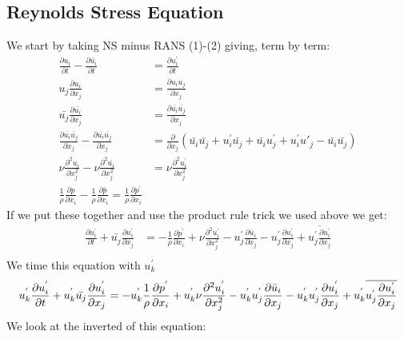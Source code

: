 \documentclass[a4paper,norsk]{article}
\begin{document}
\subsection*{Reynolds Stress Equation}
We start by taking NS minus RANS (1)-(2) giving, term by term:
\begin{align*}
\frac{\partial u_i}{\partial t} - \frac{\partial \bar{u_i}}{\partial t} &= \frac{\partial u^{'}_i}{\partial t}\\
u_j \frac{\partial u_i}{\partial x_j} &= \frac{\partial u_iu_j}{\partial x_j} \\
\bar{u_j} \frac{\partial \bar{u_i}}{\partial x_j} &= \frac{\partial \bar{u_i}\bar{u_j}}{\partial x_j} \\
\frac{\partial \bar{u_i}\bar{u_j}}{\partial x_j} - \frac{\partial \bar{u_i}\bar{u_j}}{\partial x_j} &= \frac{\partial }{\partial x_j} (\bar{u_i}\bar{u_j} + u^{'}_i\bar{u_j} + \bar{u_i}u^{'}_j + u^{'}_i u{'}_j -\bar{u_i}\bar{u_j} )\\
\nu \frac{\partial^2 u_i}{\partial x_j^2} - \nu \frac{\partial^2 \bar{u_i}} {\partial x_j^2} &= \nu \frac{\partial^2 u^{'}_i} {\partial x_j^2} \\
\frac{1}{\rho}\frac{\partial p} {\partial x_i} - \frac{1}{\rho}\frac{\partial \bar{p}} {\partial x_i} = \frac{1}{\rho}\frac{\partial p^{'}} {\partial x_i}
\end{align*}
If we put these together and use the product rule trick we used above we get:
\begin{align*}
\frac{\partial u^{'}_i}{\partial t} + \bar{u_j} \frac{\partial u^{'}_i}{\partial x_j} &= - \frac{1}{\rho}\frac{\partial p^{'}} {\partial x_i} + \nu \frac{\partial^2 u^{'}_i} {\partial x_j^2} - u^{'}_j \frac{\partial \bar{u}_i}{\partial x_j} - 
u^{'}_j \frac{\partial u^{'}_i}{\partial x_j}  + \overline{u^{'}_j \frac{\partial u^{'}_i}{\partial x_j}}   \\
\end{align*}
We time this equation with $u_k^{'}$
\begin{equation}
u_k^{'}\frac{\partial u^{'}_i}{\partial t} + u_k^{'}\bar{u_j} \frac{\partial u^{'}_i}{\partial x_j} = - u_k^{'}\frac{1}{\rho}\frac{\partial p^{'}} {\partial x_i} + u_k^{'}\nu \frac{\partial^2 u^{'}_i} {\partial x_j^2} - u_k^{'}u^{'}_j \frac{\partial \bar{u}_i}{\partial x_j} - u_k^{'}u^{'}_j \frac{\partial u^{'}_i}{\partial x_j}  + u_k^{'}\overline{u^{'}_j \frac{\partial u^{'}_i}{\partial x_j}}   \\
\end{equation}
We look at the inverted of this equation:
\end{document}

